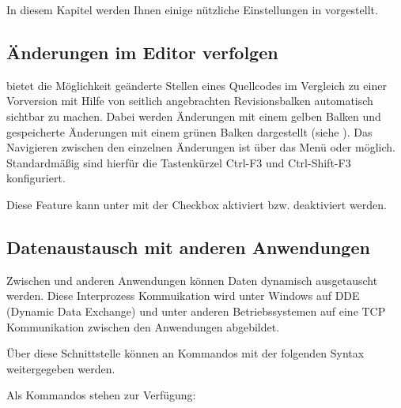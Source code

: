 In diesem Kapitel werden Ihnen einige nützliche Einstellungen in \codeblocks vorgestellt.

\subsection{Änderungen im Editor verfolgen}

\codeblocks bietet die Möglichkeit geänderte Stellen eines Quellcodes im Vergleich zu einer Vorversion mit Hilfe von seitlich angebrachten Revisionsbalken automatisch sichtbar zu machen. Dabei werden Änderungen mit einem gelben Balken und gespeicherte Änderungen mit einem grünen Balken dargestellt (siehe ). Das Navigieren zwischen den einzelnen Änderungen ist über das Menü  oder  möglich. Standardmäßig sind hierfür die Tastenkürzel Ctrl-F3 und Ctrl-Shift-F3 konfiguriert.


Diese Feature kann unter  mit der Checkbox  aktiviert bzw. deaktiviert werden.


\subsection{Datenaustausch mit anderen Anwendungen}

Zwischen \codeblocks und anderen Anwendungen können Daten dynamisch ausgetauscht werden. Diese Interprozess Kommuikation wird unter Windows auf DDE (Dynamic Data Exchange) und unter anderen Betriebssystemen auf eine TCP Kommunikation zwischen den Anwendungen abgebildet.

Über diese Schnittstelle können an \codeblocks Kommandos mit der folgenden Syntax weitergegeben werden.

\begin{code}
\end{code}

Als Kommandos stehen zur Verfügung:

